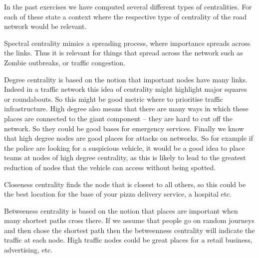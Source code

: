 In the past exercises we have computed several different types of centralities. For each of these state a context where the respective type of centrality of the road network would be relevant. 

\solution
Spectral centrality mimics a spreading process, where importance spreads across the links. Thus it is relevant for things that spread across the network such as Zombie outbreaks, or traffic congestion. 

Degree centrality is based on the notion that important nodes have many links. Indeed in a traffic network this idea of centrality might highlight major squares or roundabouts. So this might be good metric where to prioritise traffic infrastructure. High degree also means that there are many ways in which these places are connected to the giant component -- they are hard to cut off the network. So they could be good bases for emergency services. Finally we know that high degree nodes are good places for attacks on networks. So for example if the police are looking for a suspicious vehicle, it would be a good idea to place teams at nodes of high degree centrality, as this is likely to lead to the greatest reduction of nodes that the vehicle can access without being spotted.  

Closeness centrality finds the node that is closest to all others, so this could be the best location for the base of your pizza delivery service, a hospital etc.  

Betweeness centrality is based on the notion that places are important when many shortest paths cross there. If we assume that people go on random journeys and then chose the shortest path then the betweenness centrality will indicate the traffic at each node. High traffic nodes could be great places for a retail business, advertising, etc.   
